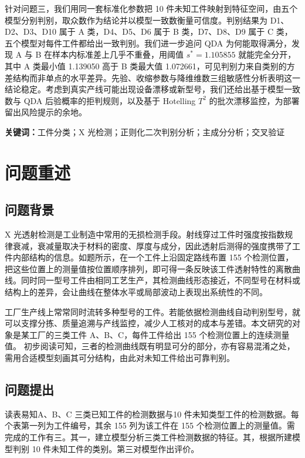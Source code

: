 \documentclass[12pt,a4paper]{article}
\newcommand{\jiacu}[1]{\textbf{\bfseries\heiti #1}}
\newcommand{\upcite}[1]{\cite{#1}}
\begin{document}
针对问题三，我们用同一套标准化参数把 10 件未知工件映射到特征空间，由五个模型分别判别，取众数作为结论并以模型一致数衡量可信度。判别结果为 D1、D2、D3、D10 属于 A 类，D4、D5、D6 属于 B 类，D7、D8、D9 属于 C 类，五个模型对每件工件都给出一致判别。我们进一步追问 QDA 为何能取得满分，发现 A 与 B 在样本内标准差上几乎不重叠，用阈值 $s^*=1.105855$ 就能完全分开，其中 A 类最小值 1.139050 高于 B 类最大值 1.072661，可见判别力来自类别的方差结构而非单点的水平差异。先验、收缩参数与降维维数三组敏感性分析表明这一结论稳定。考虑到真实产线可能出现设备漂移或新型号，我们还给出基于模型一致数与 QDA 后验概率的拒判规则，以及基于 Hotelling $T^2$ 的批次漂移监控，为部署留出风险提示的余地。

\bigskip

\noindent
\jiacu{关键词：}工件分类；X 光检测；正则化二次判别分析；主成分分析；交叉验证
\clearpage
\hypersetup{pageanchor=true}
\pagestyle{plain}

\section{问题重述}
\subsection{问题背景}

X 光透射检测是工业制造中常用的无损检测手段。射线穿过工件时强度按指数规律衰减，衰减量取决于材料的密度、厚度与成分，因此透射后测得的强度携带了工件内部结构的信息\upcite{mery2015}。如题所示，在一个工件上沿固定路线布置 155 个检测位置，把这些位置上的测量值按位置顺序排列，即可得一条反映该工件透射特性的离散曲线。同时同一型号工件由相同工艺生产，其检测曲线形态接近，不同型号在材料或结构上的差异，会让曲线在整体水平或局部波动上表现出系统性的不同。

工厂生产线上常常同时流转多种型号的工件。若能依据检测曲线自动判别型号，就可以支撑分拣、质量追溯与产线监控，减少人工核对的成本与差错。本文研究的对象是某工厂的三类工件 A、B、C，每件工件给出 155 个检测位置上的连续测量值。
初步阅读可知，三者的检测曲线既有明显可分的部分，亦有容易混淆之处，需用合适模型刻画其可分结构，由此对未知工件给出可靠判别。


\subsection{问题提出}
读表易知A、B、C 三类已知工件的检测数据与10 件未知类型工件的检测数据。每个表第一列为工件编号，其余 155 列为该工件在 155 个检测位置上的测量值。需完成的工作有三。其一，建立模型分析三类工件检测数据的特征。其，根据所建模型判别 10 件未知工件的类别。第三对模型作出评价。
\end{document}
